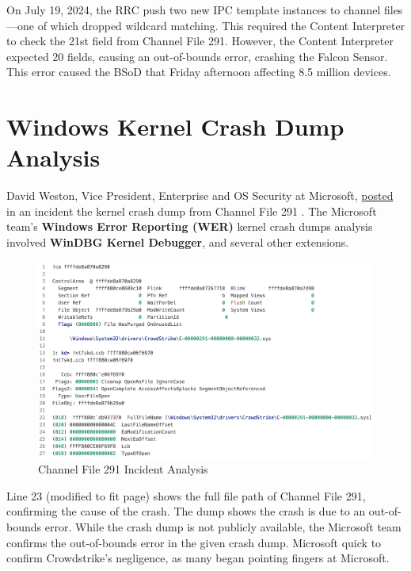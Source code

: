 On July 19, 2024, the RRC push two new IPC template instances to channel files---one of which dropped wildcard matching.
This required the Content Interpreter to check the 21st field from Channel File 291. However, the Content Interpreter
expected 20 fields, causing an out-of-bounds error, crashing the Falcon Sensor. This error
caused the BSoD that Friday afternoon affecting 8.5 million devices.

\section{Windows Kernel Crash Dump Analysis}

David Weston, Vice President, Enterprise and OS Security at Microsoft, \href{https://www.microsoft.com/en-us/security/blog/2024/07/27/windows-security-best-practices-for-integrating-and-managing-security-tools/}{posted} in an incident
the kernel crash dump from Channel File 291 \cite{weston_windows_security_2024}. The Microsoft team's \textbf{Windows Error Reporting (WER)}
kernel crash dumps analysis involved \textbf{WinDBG Kernel Debugger}, and several other extensions.

\begin{figure}[h!]
    \centering
    \includegraphics[width=1\textwidth]{Sections/crowd/fig1.png}
    \caption{Channel File 291 Incident Analysis}
    \label{fig:fig1}
\end{figure}

\noindent

\noindent
Line 23 (modified to fit page) shows the full file path of Channel File 291, confirming the cause of the crash.
The dump shows the crash is due to an out-of-bounds error.
While the crash dump is not publicly available, the Microsoft team confirms the out-of-bounds error in the given crash dump.
Microsoft quick to confirm Crowdstrike's negligence, as many began pointing fingers at Microsoft. 

